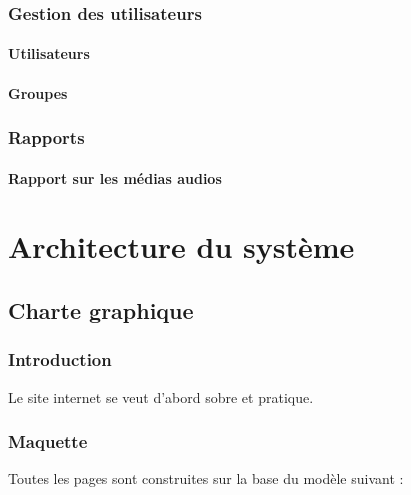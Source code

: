 \documentclass[letter, 11pt, draft]{report}
\begin{document}
\subsection{Gestion des utilisateurs}

\subsubsection{Utilisateurs}

\subsubsection{Groupes}

\subsection{Rapports}

\subsubsection{Rapport sur les médias audios}

\chapter{Architecture du système}

\section{Charte graphique}

\subsection{Introduction}

Le site internet se veut d'abord sobre et pratique.

\subsection{Maquette}

Toutes les pages sont construites sur la base du modèle suivant :
\end{document}
